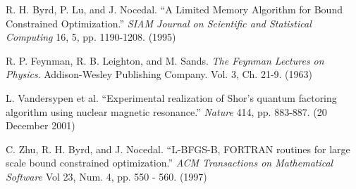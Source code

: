 \documentclass[twocolumn]{revtex4}
\begin{document}
\begin{thebibliography}{9}
 R. H. Byrd, P. Lu, and J. Nocedal. ``A Limited Memory
  Algorithm for Bound Constrained Optimization.'' \textit{SIAM Journal
    on Scientific and Statistical Computing} 16, 5,
  pp. 1190-1208. (1995)
  
 R. P. Feynman, R. B. Leighton, and
  M. Sands. \textit{The Feynman Lectures on Physics}. Addison-Wesley
  Publishing Company. Vol. 3, Ch. 21-9. (1963)

 L. Vandersypen et al. ``Experimental realization
  of Shor's quantum factoring algorithm using nuclear magnetic
  resonance.'' \textit{Nature} 414, pp. 883-887. (20 December 2001)
  
 C. Zhu, R. H. Byrd, and J. Nocedal. ``L-BFGS-B, FORTRAN
  routines for large scale bound constrained optimization.''
  \textit{ACM Transactions on Mathematical Software} Vol 23, Num. 4,
  pp. 550 - 560. (1997)

\end{thebibliography}
\end{document}
